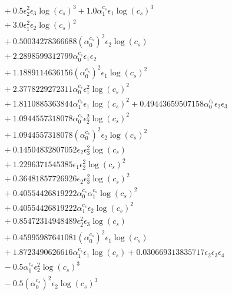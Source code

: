 \documentclass[10pt]{article}
\begin{document}
\begin{align*}
&{}  + 0.5 \epsilon_{2}^{2} \epsilon_{3} \log{\left(c_{s} \right)}^{3} + 1.0 \alpha_{1}^{c_s} \epsilon_{1} \log{\left(c_{s} \right)}^{3} \\
&{}  + 3.0 \epsilon_{1}^{2} \epsilon_{2} \log{\left(c_{s} \right)}^{2} \\
&{}  + 0.50034278366688 \left(\alpha_{0}^{c_s}\right)^{2} \epsilon_{2} \log{\left(c_{s} \right)} \\
&{}  + 2.2898599312799 \alpha_{0}^{c_s} \epsilon_{1} \epsilon_{2} \\
&{}  + 1.1889114636156 \left(\alpha_{0}^{c_s}\right)^{2} \epsilon_{1} \log{\left(c_{s} \right)}^{2} \\
&{}  + 2.3778229272311 \alpha_{0}^{c_s} \epsilon_{1}^{2} \log{\left(c_{s} \right)}^{2} \\
&{}  + 1.8110885363844 \alpha_{1}^{c_s} \epsilon_{1} \log{\left(c_{s} \right)}^{2} + 0.49443659507158 \alpha_{0}^{c_s} \epsilon_{2} \epsilon_{3} \\
&{}  + 1.0944557318078 \alpha_{0}^{c_s} \epsilon_{2}^{2} \log{\left(c_{s} \right)}^{2} \\
&{}  + 1.0944557318078 \left(\alpha_{0}^{c_s}\right)^{2} \epsilon_{2} \log{\left(c_{s} \right)}^{2} \\
&{}  + 0.14504832807052 \epsilon_{2} \epsilon_{3}^{2} \log{\left(c_{s} \right)} \\
&{}  + 1.2296371545385 \epsilon_{1} \epsilon_{2}^{2} \log{\left(c_{s} \right)}^{2} \\
&{}  + 0.36481857726926 \epsilon_{2} \epsilon_{3}^{2} \log{\left(c_{s} \right)}^{2} \\
&{}  + 0.40554426819222 \alpha_{0}^{c_s} \alpha_{1}^{c_s} \log{\left(c_{s} \right)}^{2} \\
&{}  + 0.40554426819222 \alpha_{1}^{c_s} \epsilon_{2} \log{\left(c_{s} \right)}^{2} \\
&{}  + 0.85472314948489 \epsilon_{2}^{2} \epsilon_{3} \log{\left(c_{s} \right)} \\
&{}  + 0.45995987641081 \left(\alpha_{0}^{c_s}\right)^{2} \epsilon_{1} \log{\left(c_{s} \right)} \\
&{}  + 1.8723490626616 \alpha_{1}^{c_s} \epsilon_{1} \log{\left(c_{s} \right)} + 0.030669313835717 \epsilon_{2} \epsilon_{3} \epsilon_{4} \\
&{}  - 0.5 \alpha_{0}^{c_s} \epsilon_{2}^{2} \log{\left(c_{s} \right)}^{3} \\
&{}  - 0.5 \left(\alpha_{0}^{c_s}\right)^{2} \epsilon_{2} \log{\left(c_{s} \right)}^{3} \\

\end{align*}
\end{document}
